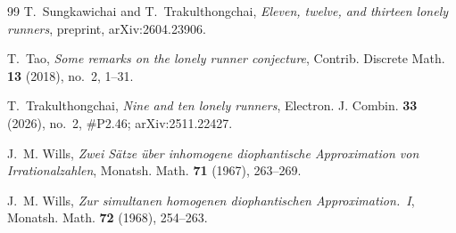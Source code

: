 \documentclass[11pt]{article}
\theoremstyle{definition}
\begin{document}
\begin{thebibliography}{99}
T.~Sungkawichai and T.~Trakulthongchai, \emph{Eleven, twelve, and thirteen
lonely runners}, preprint, arXiv:2604.23906.

T.~Tao, \emph{Some remarks on the lonely runner conjecture},
Contrib. Discrete Math. \textbf{13} (2018), no.~2, 1--31.

T.~Trakulthongchai, \emph{Nine and ten lonely runners}, Electron. J.
Combin. \textbf{33} (2026), no.~2, \#P2.46; arXiv:2511.22427.

J.~M. Wills, \emph{Zwei S\"atze \"uber inhomogene diophantische
Approximation von Irrationalzahlen}, Monatsh. Math. \textbf{71} (1967),
263--269.

J.~M. Wills, \emph{Zur simultanen homogenen diophantischen
Approximation.~I}, Monatsh. Math. \textbf{72} (1968), 254--263.

\end{thebibliography}
\end{document}
